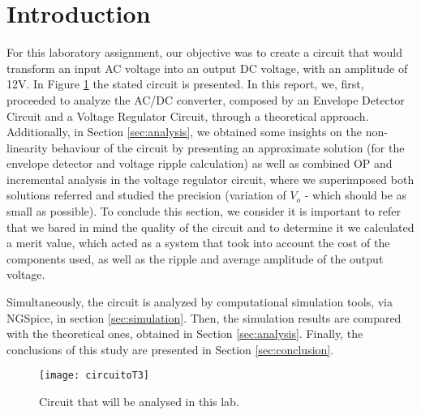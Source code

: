 \pagebreak
\section{Introduction}
\label{sec:introduction}


For this laboratory assignment, our objective was to create a circuit that would transform an input AC voltage into an output DC voltage, with an amplitude of 12V. In Figure \ref{fig:circuit} the stated circuit is presented. 
In this report, we, first, proceeded to analyze the AC/DC converter, composed by an Envelope Detector Circuit and a Voltage Regulator Circuit, through a theoretical approach. Additionally, in Section \ref{sec:analysis}, we obtained some insights on the non-linearity behaviour of the circuit by presenting an approximate solution (for the envelope detector and voltage ripple calculation) as well as combined OP and incremental analysis in the voltage regulator circuit, where we superimposed both solutions referred and studied the precision (variation of $V_{o}$ - which should be as small as possible). To conclude this section, we consider it is important to refer that we bared in mind the quality of the circuit and to determine it we calculated a merit value, which acted as a system that took into account the cost of the components used, as well as the ripple and average amplitude of the output voltage. 

Simultaneously, the circuit is analyzed by computational simulation tools, via NGSpice, in section \ref{sec:simulation}. Then, the simulation results are compared with the theoretical ones, obtained in Section \ref{sec:analysis}. Finally, the conclusions of this study are presented in Section \ref{sec:conclusion}.



\begin{figure}[h] \centering
	\texttt{[image: circuitoT3]}
	\caption{Circuit that will be analysed in this lab.}
	\label{fig:circuit}
\end{figure}

\newpage

